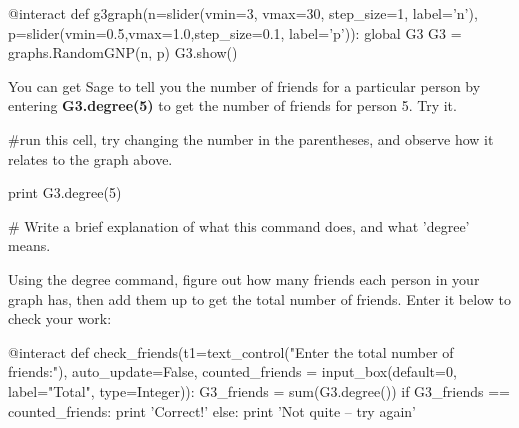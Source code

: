 \begin{sageverbatim}
@interact
def g3graph(n=slider(vmin=3, vmax=30, step_size=1, label='n'), p=slider(vmin=0.5,vmax=1.0,step_size=0.1, label='p')):
    global G3 
    G3 = graphs.RandomGNP(n, p)
    G3.show()
\end{sageverbatim}

You can get Sage to tell you the number of friends for a particular person by entering \textbf{G3.degree(5)}
to get the number of friends for person 5.  Try it.

\begin{sageverbatim}
#run this cell, try changing the number in the parentheses, and observe how it relates to the graph above.

print G3.degree(5)

# Write a brief explanation of what this command does, and what 'degree' means.
\end{sageverbatim}

Using the degree command, figure out how many friends each person in
your graph has, then add them up to get the total number of friends.
Enter it below to check your work:

\begin{sageverbatim}
@interact
def check_friends(t1=text_control("Enter the total number of friends:"), auto_update=False, 
    counted_friends = input_box(default=0, label="Total", type=Integer)):
    G3_friends = sum(G3.degree())
    if G3_friends == counted_friends:
        print 'Correct!'
    else:
        print 'Not quite -- try again'
\end{sageverbatim}


%









